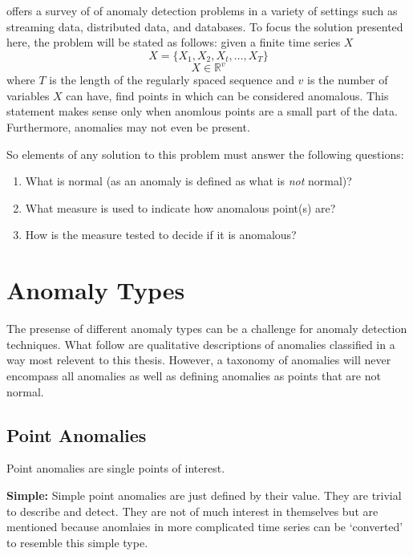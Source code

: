 
\cite{Gupta2013} offers a survey of of anomaly detection problems in a variety of settings such as streaming data, distributed data, and databases. To focus the solution presented here, the problem will be stated as follows: given a finite time series $X$
 \[ X=\{X_1,X_2,X_t,\ldots,X_T\}\]
\[  X \in \mathbb{R}^v \]
where $T$ is the length of the regularly spaced sequence and $v$ is the number of variables $X$ can have, find points in which can be considered anomalous. This statement makes sense only when anomlous points are a small part of the data. Furthermore, anomalies may not even be present.

So elements of any solution to this problem must answer the following questions:

\begin{enumerate}
\item
What is normal (as an anomaly is defined as what is \textit{not} normal)?
\item
What measure is used to indicate how anomalous point(s) are?
\item
How is the measure tested to decide if it is anomalous?
\end{enumerate}



\section[adtypes]{Anomaly Types}

The presense of different anomaly types can be a challenge for anomaly detection techniques. What follow are qualitative descriptions of anomalies classified in a way most relevent to this thesis. However, a taxonomy of anomalies will never encompass all anomalies as well as defining anomalies as points that are not normal.

\subsection[ptanom]{Point Anomalies}

Point anomalies are single points of interest.

\textbf{Simple:} Simple point anomalies are just defined by their value. They are trivial to describe and detect. They are not of much interest in themselves but are mentioned because anomlaies in more complicated time series can be `converted' to resemble this simple type.


